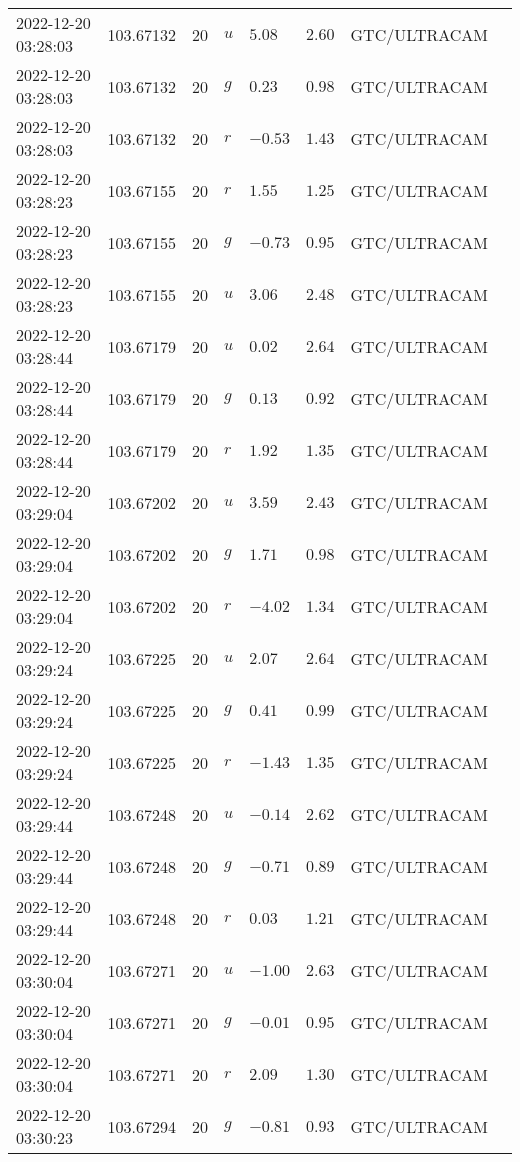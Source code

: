 \documentclass{nature_plusfigure}
\begin{document}
\begin{supplement}
\begin{center}
\begin{longtable}{llllllll}
2022-12-20 03:28:03 & 103.67132 & 20 & $u$ & $5.08$ & $2.60$ & GTC/ULTRACAM &  \\ 
2022-12-20 03:28:03 & 103.67132 & 20 & $g$ & $0.23$ & $0.98$ & GTC/ULTRACAM &  \\ 
2022-12-20 03:28:03 & 103.67132 & 20 & $r$ & $-0.53$ & $1.43$ & GTC/ULTRACAM &  \\ 
2022-12-20 03:28:23 & 103.67155 & 20 & $r$ & $1.55$ & $1.25$ & GTC/ULTRACAM &  \\ 
2022-12-20 03:28:23 & 103.67155 & 20 & $g$ & $-0.73$ & $0.95$ & GTC/ULTRACAM &  \\ 
2022-12-20 03:28:23 & 103.67155 & 20 & $u$ & $3.06$ & $2.48$ & GTC/ULTRACAM &  \\ 
2022-12-20 03:28:44 & 103.67179 & 20 & $u$ & $0.02$ & $2.64$ & GTC/ULTRACAM &  \\ 
2022-12-20 03:28:44 & 103.67179 & 20 & $g$ & $0.13$ & $0.92$ & GTC/ULTRACAM &  \\ 
2022-12-20 03:28:44 & 103.67179 & 20 & $r$ & $1.92$ & $1.35$ & GTC/ULTRACAM &  \\ 
2022-12-20 03:29:04 & 103.67202 & 20 & $u$ & $3.59$ & $2.43$ & GTC/ULTRACAM &  \\ 
2022-12-20 03:29:04 & 103.67202 & 20 & $g$ & $1.71$ & $0.98$ & GTC/ULTRACAM &  \\ 
2022-12-20 03:29:04 & 103.67202 & 20 & $r$ & $-4.02$ & $1.34$ & GTC/ULTRACAM &  \\ 
2022-12-20 03:29:24 & 103.67225 & 20 & $u$ & $2.07$ & $2.64$ & GTC/ULTRACAM &  \\ 
2022-12-20 03:29:24 & 103.67225 & 20 & $g$ & $0.41$ & $0.99$ & GTC/ULTRACAM &  \\ 
2022-12-20 03:29:24 & 103.67225 & 20 & $r$ & $-1.43$ & $1.35$ & GTC/ULTRACAM &  \\ 
2022-12-20 03:29:44 & 103.67248 & 20 & $u$ & $-0.14$ & $2.62$ & GTC/ULTRACAM &  \\ 
2022-12-20 03:29:44 & 103.67248 & 20 & $g$ & $-0.71$ & $0.89$ & GTC/ULTRACAM &  \\ 
2022-12-20 03:29:44 & 103.67248 & 20 & $r$ & $0.03$ & $1.21$ & GTC/ULTRACAM &  \\ 
2022-12-20 03:30:04 & 103.67271 & 20 & $u$ & $-1.00$ & $2.63$ & GTC/ULTRACAM &  \\ 
2022-12-20 03:30:04 & 103.67271 & 20 & $g$ & $-0.01$ & $0.95$ & GTC/ULTRACAM &  \\ 
2022-12-20 03:30:04 & 103.67271 & 20 & $r$ & $2.09$ & $1.30$ & GTC/ULTRACAM &  \\ 
2022-12-20 03:30:23 & 103.67294 & 20 & $g$ & $-0.81$ & $0.93$ & GTC/ULTRACAM &  \\ 

\end{longtable}
\end{center}
\end{supplement}
\end{document}
